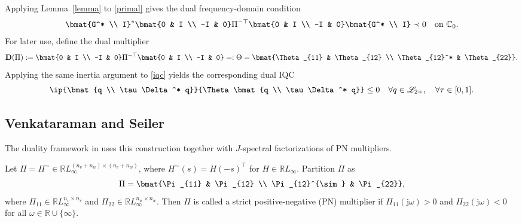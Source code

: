 Applying Lemma~\ref{lemma} to \eqref{primal} gives the dual frequency-domain condition
\begin{equation}\label{dual}
    \bmat{G^* \\ I}^* \bmat{0 & I \\ -I & 0} \Pi^{-\top}
    \bmat{0 & I \\ -I & 0} \bmat{G^* \\ I}
    \prec 0
    \quad \text{on } \mathbb{C}_0.
\end{equation}
For later use, define the dual multiplier
\begin{equation}\label{dual_multiplier}
    \mathbf{D}(\Pi)
    := \bmat{0 & I \\ -I & 0} \Pi^{-\top} \bmat{0 & I \\ -I & 0}
    =: \Theta
    = \bmat{\Theta_{11} & \Theta_{12} \\ \Theta_{12}^* & \Theta_{22}}.
\end{equation}
Applying the same inertia argument to \eqref{iqc} yields the corresponding dual IQC
\begin{equation}\label{dual_iqc}
    \ip{\bmat{q \\ \tau\Delta^* q}}{\Theta\bmat{q \\ \tau\Delta^* q}} \leq 0
    \quad \forall q \in \mathscr{L}_{2+}, \quad \forall \tau \in [0,1].
\end{equation}

\subsection{Venkataraman and Seiler}
The duality framework in \cite{venkataraman} uses this construction together with $J$-spectral factorizations of PN multipliers.
\begin{definition}\label{PN}
    Let $\Pi=\Pi^{\sim}\in\mathbb{R}L_\infty^{(n_v+n_w)\times(n_v+n_w)}$, where
    $H^\sim(s)=H(-s)^\top$ for $H\in\mathbb{R}L_\infty$.
    Partition $\Pi$ as
    \[
        \Pi=\bmat{\Pi_{11} & \Pi_{12} \\ \Pi_{12}^{\sim} & \Pi_{22}},
    \]
    where $\Pi_{11}\in\mathbb{R}L_\infty^{n_v\times n_v}$ and
    $\Pi_{22}\in\mathbb{R}L_\infty^{n_w\times n_w}$. Then $\Pi$ is called a strict
    positive-negative (PN) multiplier if
    $\Pi_{11}(\mathrm{j}\omega)>0$ and $\Pi_{22}(\mathrm{j}\omega)<0$ for all
    $\omega\in\mathbb{R}\cup\{\infty\}$.
\end{definition}

